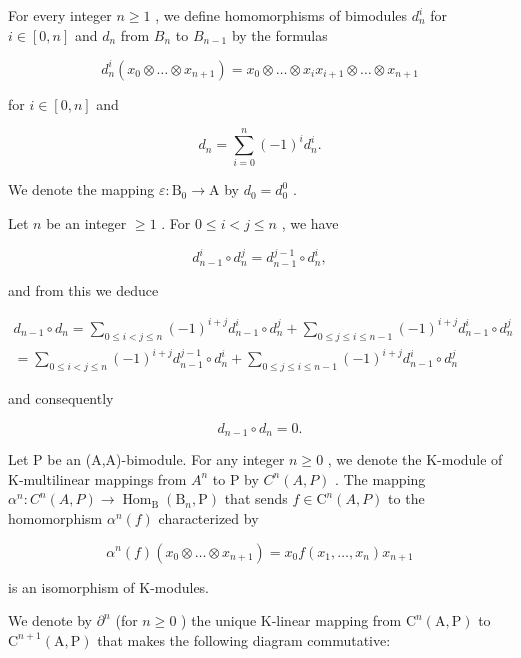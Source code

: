 For every integer \(n \geqslant 1\) , we define homomorphisms of bimodules \(d_{n}^{i}\) for \(i \in [0, n]\) and \(d_{n}\) from \(B_{n}\) to \(B_{n-1}\) by the formulas

\[
d _ {n} ^ {i} (x _ {0} \otimes \dots \otimes x _ {n + 1}) = x _ {0} \otimes \dots \otimes x _ {i} x _ {i + 1} \otimes \dots \otimes x _ {n + 1}\tag{4}
\]

for \(i\in [0,n]\) and

\[
d _ {n} = \sum_ {i = 0} ^ {n} (- 1) ^ {i} d _ {n} ^ {i}.\tag{5}
\]

We denote the mapping \(\varepsilon : \mathrm{B}_0 \to \mathrm{A}\) by \(d_0 = d_0^0\) .

Let \(n\) be an integer \(\geqslant 1\) . For \(0 \leqslant i < j \leqslant n\) , we have

\[
d _ {n - 1} ^ {i} \circ d _ {n} ^ {j} = d _ {n - 1} ^ {j - 1} \circ d _ {n} ^ {i},\tag{6}
\]

and from this we deduce

\[
\begin{array}{c} d _ {n - 1} \circ d _ {n} = \sum_ {0 \leqslant i <   j \leqslant n} (- 1) ^ {i + j} d _ {n - 1} ^ {i} \circ d _ {n} ^ {j} + \sum_ {0 \leqslant j \leqslant i \leqslant n - 1} (- 1) ^ {i + j} d _ {n - 1} ^ {i} \circ d _ {n} ^ {j} \\ = \sum_ {0 \leqslant i <   j \leqslant n} (- 1) ^ {i + j} d _ {n - 1} ^ {j - 1} \circ d _ {n} ^ {i} + \sum_ {0 \leqslant j \leqslant i \leqslant n - 1} (- 1) ^ {i + j} d _ {n - 1} ^ {i} \circ d _ {n} ^ {j} \end{array}
\]

and consequently

\[
d _ {n - 1} \circ d _ {n} = 0.\tag{7}
\]

Let P be an (A,A)-bimodule. For any integer \(n \geqslant 0\) , we denote the K-module of K-multilinear mappings from \(A^{n}\) to P by \(C^{n}(A,P)\) . The mapping \(\alpha^{n}: C^{n}(A,P) \to \operatorname{Hom}_{\mathrm{B}}(\mathrm{B}_{n},\mathrm{P})\) that sends \(f \in \mathrm{C}^{n}(A,P)\) to the homomorphism \(\alpha^{n}(f)\) characterized by

\[
\alpha^ {n} (f) \left(x _ {0} \otimes \dots \otimes x _ {n + 1}\right) = x _ {0} f (x _ {1}, \ldots , x _ {n}) x _ {n + 1}\tag{8}
\]

is an isomorphism of K-modules.

We denote by \(\partial^{n}\) (for \(n \geqslant 0\) ) the unique K-linear mapping from \(\mathrm{C}^{n}(\mathrm{A},\mathrm{P})\) to \(\mathrm{C}^{n+1}(\mathrm{A},\mathrm{P})\) that makes the following diagram commutative:

